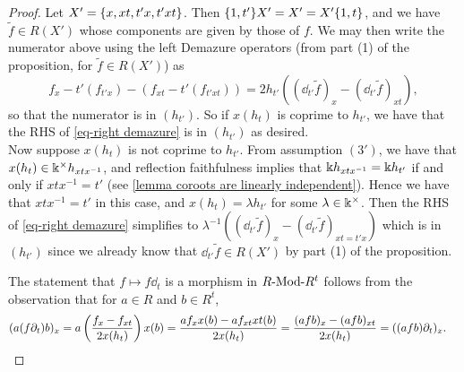 \begin{proof}
Let $X'=\{x,xt,t'x,t'xt\}$. 
Then $\{1,t'\}X'=X'=X'\{1,t\}$, and we have $\tilde{f}\in R(X')$ whose components are given by those of $f$.
We may then write the numerator above using the left Demazure operators (from part (1) of the proposition, for $\tilde{f} \in R(X')$) as
$$f_x-t'(f_{t'x}) - (f_{xt}-t'(f_{t'xt}))=2h_{t'}\left((\dd_{t'}\tilde{f})_x-(\dd_{t'}\tilde{f})_{xt}\right),$$
so that the numerator is in $(h_{t'}).$
So if $x(h_t)$ is coprime to $h_{t'}$, we have that the RHS of \cref{eq-right demazure} is in $(h_{t'})$ as desired.\\
Now suppose $x(h_t)$ is not coprime to $h_{t'}$. 
From assumption $\hyperref[assumption 3']{(3')}$, we have that $x(h_t) \in \Bbbk^\times h_{xtx^{-1}}$, and reflection faithfulness implies that $\Bbbk h_{xtx^{-1}}=\Bbbk h_{t'}$ if and only if $xtx^{-1}=t'$ (see \cref{lemma coroots are linearly independent}).
Hence we have that $xtx^{-1}=t'$ in this case,
and $x(h_t)=\lambda h_{t'}$ for some $\lambda \in \Bbbk^\times$. 
Then the RHS of \eqref{eq-right demazure} simplifies to $\lambda^{-1}\left((\dd_{t'}\tilde{f})_x-(\dd_{t'}\tilde{f})_{xt=t'x} \right)$ which is in $(h_{t'})$ since we already know that $\dd_{t'}\tilde{f} \in R(X')$ by part (1) of the proposition. 

The statement that $f \mapsto f\dd_t$ is a morphism in $\text{${R}$-Mod-${R^t}$}$ follows from the observation that for $a\in R$ and $b \in R^t$,
\begin{align*}
(a(f\partial_t)b)_x=a\left(\frac{f_x - f_{xt}}{2x(h_t)} \right)x(b)= \frac{af_xx(b) - af_{xt}xt(b)}{2x(h_t)}=\frac{(afb)_x - (afb)_{xt}}{2x(h_t)}=((afb)\partial_t)_x.&\qedhere
\end{align*}
\end{proof}

